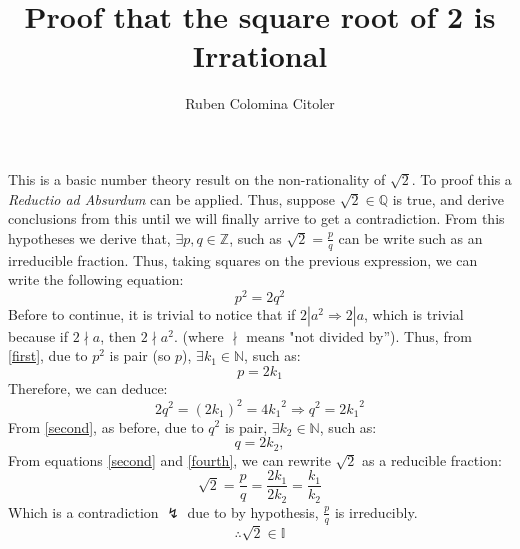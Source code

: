 \documentclass{article}
\title{Proof that the square root of 2 is Irrational}
\author{Ruben Colomina Citoler}
\begin{document}
\maketitle
This is a basic number theory result on the non-rationality of $\sqrt{2}$. To proof this  a \textit{Reductio ad Absurdum} can be applied. Thus, suppose $\sqrt{2} \in \mathds{Q} $ is true, and derive conclusions from this until we will finally arrive to get a contradiction. From this hypotheses we derive that, $\exists p,q \in \mathds{Z}$, such as $\sqrt{2} = \frac{p}{q}$ can be write such as an irreducible fraction. Thus, taking squares on the previous expression, we can write the following equation:
\begin{equation}
  p^2 = 2 q^2 
\label{first}  
\end{equation}
Before to continue, it is trivial to notice that if $2 | a^2 \Rightarrow 2 | a$, which is trivial because if $2 \nmid a$, then $2 \nmid a^2.$ (where $\nmid$ means "not divided by'').
Thus, from \eqref{first}, due to $p^2$ is pair (so $p$), $\exists k_1 \in \mathds{N}$, such as:
\begin{equation}
  p = 2k_1
  \label{second}
\end{equation}
Therefore, we can deduce:
\begin{equation}
  2 q^2 = (2k_1)^2 = 4{k_1}^2 \Rightarrow q^2 = 2 {k_1}^2 
  \label{third}
\end{equation}
From \eqref{second}, as before, due to $q^2$ is pair, $\exists k_2 \in \mathds{N}$, such as:  
\begin{equation}
  q = 2 k_2,
  \label{fourth}
\end{equation}
From equations \eqref{second} and \eqref{fourth}, we can rewrite $\sqrt{2}$ as a reducible fraction:
\begin{equation}
 \sqrt{2} = \frac{p}{q} = \frac{2 k_1}{2 k_2} = \frac{k_1}{k_2} 
\end{equation}
Which is a contradiction $\lightning$ due to by hypothesis, $\frac{p}{q}$ is irreducibly.
\begin{equation*}
\therefore \sqrt{2} \in \mathds{I}
\end{equation*}
\end{document}
